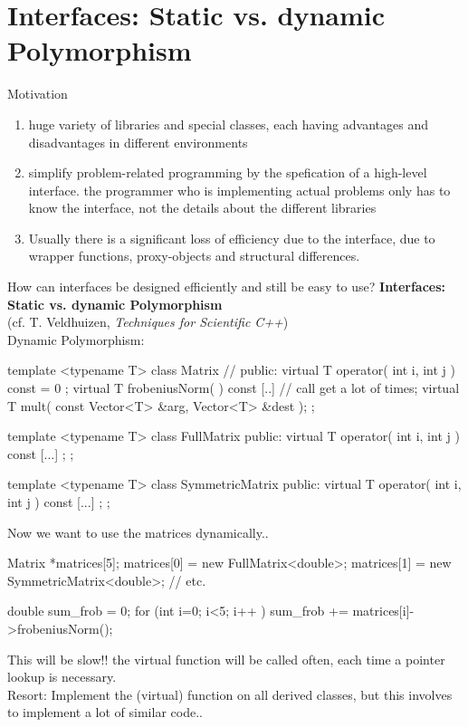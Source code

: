 \section{Interfaces: Static vs. dynamic Polymorphism}

Motivation
\begin{enumerate}
\item huge variety of libraries and special classes, each having
advantages and disadvantages in different environments
\item simplify problem-related programming by the spefication
  of a high-level interface. the programmer who is implementing
actual problems only has to know the interface, not the details
about the different libraries
\item Usually there is a significant loss of efficiency due to the interface,
 due to wrapper functions, proxy-objects and structural differences.
\end{enumerate}

How can interfaces be designed efficiently and still be easy to use?
\textbf{Interfaces: Static vs. dynamic Polymorphism} \\
(cf. T. Veldhuizen, {\em Techniques for Scientific C++})\\
{Dynamic Polymorphism:}
\begin{myverbatim}
template <typename T> class Matrix { //
public:
  virtual T operator( int i, int j ) const = 0 { };
  virtual T frobeniusNorm( ) const { [..] // call get a lot of times; }
  virtual T mult( const Vector<T> &arg, Vector<T> &dest );
};

template <typename T> class FullMatrix {
public:
  virtual T operator( int i, int j ) const { [...] };
};

template <typename T> class SymmetricMatrix {
public:
  virtual T operator( int i, int j ) const { [...] };
};
\end{myverbatim}

Now we want to use the matrices dynamically..
\begin{myverbatim}
Matrix *matrices[5];
matrices[0] = new FullMatrix<double>;
matrices[1] = new SymmetricMatrix<double>;
// etc.

double sum_frob = 0;
for (int i=0; i<5; i++ ) {
  sum_frob += matrices[i]->frobeniusNorm();
}
\end{myverbatim}

{This will be slow!!} the virtual function  will be called
often, each time a pointer lookup is necessary. \\
Resort: Implement the (virtual) function  on all derived classes,
but this involves to implement a lot of similar code..

